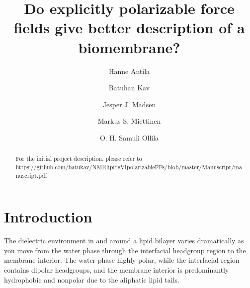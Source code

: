 \documentclass[journal=jacsat,manuscript=article,layout=singlecolumn]{achemso}
\author{Hanne Antila}
\author{Batuhan Kav}
\affiliation{Forschungszentrum Juelich, Germany}
\author{Jesper J. Madsen}
\author{Markus S. Miettinen}
\author{O. H. Samuli Ollila}
\title{Do explicitly polarizable force fields give better description of a biomembrane?}
\begin{document}


\begin{abstract}
	
	For the initial project description, please refer to \\ https://github.com/batukav/NMRlipidsVIpolarizableFFs/blob/master/Manuscript/manuscript.pdf
	
\end{abstract}

\section{Introduction}


The dielectric environment in and around a lipid bilayer varies dramatically as you move from the water phase through the interfacial headgroup region to the membrane interior. The water phase highly polar, while the interfacial region contains dipolar headgroups, and the membrane interior is predominantly hydrophobic and nonpolar due to the aliphatic lipid tails. 
\end{document}
